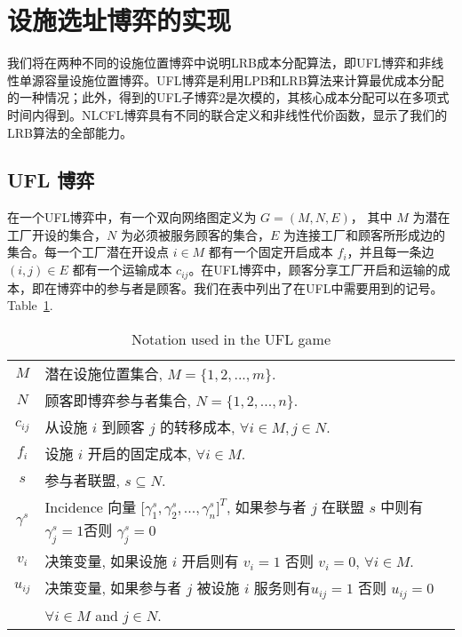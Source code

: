 \documentclass[UTF8]{article}
\begin{document}
\section{设施选址博弈的实现}
我们将在两种不同的设施位置博弈中说明LRB成本分配算法，即UFL博弈和非线性单源容量设施位置博弈。UFL博弈是利用LPB和LRB算法来计算最优成本分配的一种情况；此外，得到的UFL子博弈2是次模的，其核心成本分配可以在多项式时间内得到。NLCFL博弈具有不同的联合定义和非线性代价函数，显示了我们的LRB算法的全部能力。

  \subsection{UFL 博弈}\label{section:UFL}
在一个UFL博弈中，有一个双向网络图定义为 $G=(M,N,E)$， 其中 $M$ 为潜在工厂开设的集合，$N$ 为必须被服务顾客的集合，$E$ 为连接工厂和顾客所形成边的集合。每一个工厂潜在开设点 $i \in M$ 都有一个固定开启成本 $f_i$，并且每一条边 $(i,j) \in E$ 都有一个运输成本 $c_{ij}$。在UFL博弈中，顾客分享工厂开启和运输的成本，即在博弈中的参与者是顾客。我们在表中列出了在UFL中需要用到的记号。
Table~\ref{table:notationsUFL}.
\begin{table}[H]
\vspace{-2mm}
\tabcolsep=7pt
\small
\renewcommand\arraystretch{1.5}
\caption{\label{table:notationsUFL} Notation used in the UFL game}
\begin{tabular}[!h]{c c}
\hline
\multicolumn{1}{c}{$M$} &\multicolumn{1}{l}{潜在设施位置集合, $M=\big\{1,2,...,m\big\}$.}\\
\multicolumn{1}{c}{$N$} &\multicolumn{1}{l}{顾客即博弈参与者集合, $N=\big\{1,2,...,n\big\}$.}\\
\multicolumn{1}{c}{$c_{ij}$} &\multicolumn{1}{l}{从设施 $i$ 到顾客 $j$ 的转移成本, $\forall i \in M, j \in N$.}\\
\multicolumn{1}{c}{$f_i$} &\multicolumn{1}{l}{设施 $i$ 开启的固定成本, $\forall i \in M$.}\\
\multicolumn{1}{c}{$s$} &\multicolumn{1}{l}{参与者联盟, $s \subseteq N$.}\\
\multicolumn{1}{c}{$\gamma^s$} &\multicolumn{1}{l}{Incidence 向量 $\big[ \gamma^{s}_1,\gamma^{s}_2,...,\gamma^{s}_{n}\big]^T$, 如果参与者 $j$ 在联盟 $s$ 中则有$\gamma^{s}_j=1$否则 $\gamma^{s}_j=0$}\\
\multicolumn{1}{c}{$v_i$} &\multicolumn{1}{l}{决策变量, 如果设施 $i$ 开启则有 $v_i=1$ 否则 $v_i=0$, $\forall i \in M$.}\\
\multicolumn{1}{c}{$u_{ij}$} &\multicolumn{1}{l}{决策变量, 如果参与者 $j$ 被设施 $i$ 服务则有$u_{ij}=1$ 否则 $u_{ij}=0$}\\
\multicolumn{1}{c}{} &\multicolumn{1}{l}{ $\forall i \in M$ and $j \in N$.}\\
\hline
\end{tabular}
\vspace{-3mm}
\end{table}
\end{document}
